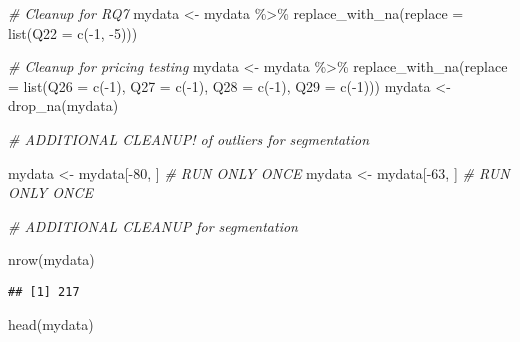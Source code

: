 \documentclass[
]{article}
\newenvironment{Shaded}{\begin{snugshade}}{\end{snugshade}}
\newcommand{\AttributeTok}[1]{\textcolor[rgb]{0.77,0.63,0.00}{#1}}
\newcommand{\CommentTok}[1]{\textcolor[rgb]{0.56,0.35,0.01}{\textit{#1}}}
\newcommand{\DecValTok}[1]{\textcolor[rgb]{0.00,0.00,0.81}{#1}}
\newcommand{\FunctionTok}[1]{\textcolor[rgb]{0.00,0.00,0.00}{#1}}
\newcommand{\NormalTok}[1]{#1}
\newcommand{\OtherTok}[1]{\textcolor[rgb]{0.56,0.35,0.01}{#1}}
\newcommand{\SpecialCharTok}[1]{\textcolor[rgb]{0.00,0.00,0.00}{#1}}
\begin{document}
\begin{Shaded}
\begin{Highlighting}[]
\CommentTok{\# Cleanup for RQ7}
\NormalTok{mydata }\OtherTok{\textless{}{-}}\NormalTok{ mydata }\SpecialCharTok{\%\textgreater{}\%} \FunctionTok{replace\_with\_na}\NormalTok{(}\AttributeTok{replace =} \FunctionTok{list}\NormalTok{(}\AttributeTok{Q22 =} \FunctionTok{c}\NormalTok{(}\SpecialCharTok{{-}}\DecValTok{1}\NormalTok{, }\SpecialCharTok{{-}}\DecValTok{5}\NormalTok{)))}

\CommentTok{\# Cleanup for pricing testing}
\NormalTok{mydata }\OtherTok{\textless{}{-}}\NormalTok{ mydata }\SpecialCharTok{\%\textgreater{}\%} \FunctionTok{replace\_with\_na}\NormalTok{(}\AttributeTok{replace =} \FunctionTok{list}\NormalTok{(}\AttributeTok{Q26 =} \FunctionTok{c}\NormalTok{(}\SpecialCharTok{{-}}\DecValTok{1}\NormalTok{), }\AttributeTok{Q27 =} \FunctionTok{c}\NormalTok{(}\SpecialCharTok{{-}}\DecValTok{1}\NormalTok{), }\AttributeTok{Q28 =} \FunctionTok{c}\NormalTok{(}\SpecialCharTok{{-}}\DecValTok{1}\NormalTok{), }\AttributeTok{Q29 =} \FunctionTok{c}\NormalTok{(}\SpecialCharTok{{-}}\DecValTok{1}\NormalTok{)))}
\NormalTok{mydata }\OtherTok{\textless{}{-}} \FunctionTok{drop\_na}\NormalTok{(mydata)}

\CommentTok{\# ADDITIONAL CLEANUP! of outliers for segmentation}


\NormalTok{mydata }\OtherTok{\textless{}{-}}\NormalTok{ mydata[}\SpecialCharTok{{-}}\DecValTok{80}\NormalTok{, ] }\CommentTok{\# RUN ONLY ONCE}
\NormalTok{mydata }\OtherTok{\textless{}{-}}\NormalTok{ mydata[}\SpecialCharTok{{-}}\DecValTok{63}\NormalTok{, ] }\CommentTok{\# RUN ONLY ONCE}

\CommentTok{\# ADDITIONAL CLEANUP for segmentation}

\FunctionTok{nrow}\NormalTok{(mydata)}
\end{Highlighting}
\end{Shaded}

\begin{verbatim}
## [1] 217
\end{verbatim}

\begin{Shaded}
\begin{Highlighting}[]
\FunctionTok{head}\NormalTok{(mydata)}
\end{Highlighting}
\end{Shaded}
\end{document}
